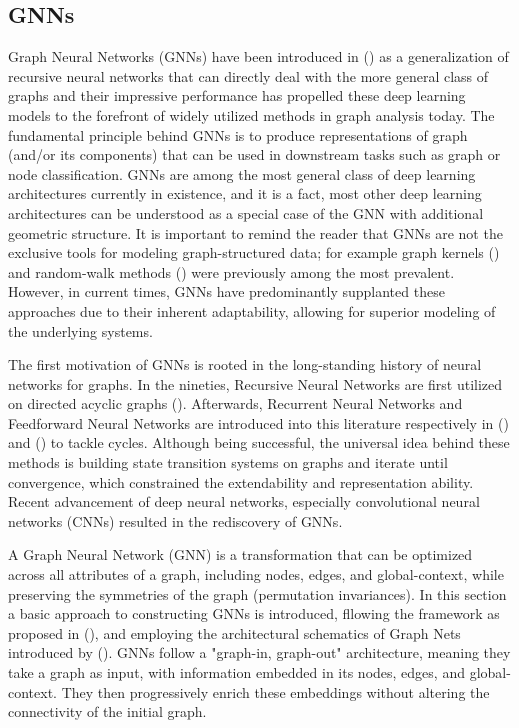 \documentclass[binding=0.6cm]{sapthesis}
\newcommand{\mycite}[1]{(\cite{#1})}
\begin{document}
\subsection{GNNs}
\label{sec:bg.gnn.gnns}
Graph Neural Networks (GNNs) have been introduced in \mycite{Gori2005graphDomain,gnnModel2009} as a generalization of recursive neural networks that can directly deal with the more general class of graphs and their impressive performance has propelled these deep learning models to the forefront of widely utilized methods in graph analysis today. The fundamental principle behind GNNs is to produce representations of graph (and/or its components) that can be used in downstream tasks such as graph or node classification. GNNs are among the most general class of deep learning architectures currently in existence, and it is a fact, most other deep learning architectures can be understood as a special case of the GNN with additional geometric structure. It is important to remind the reader that GNNs are not the exclusive tools for modeling graph-structured data; for example graph kernels \mycite{vishwanathan2010-graph-kernels} and random-walk methods \mycite{grover2016-node2vec,perozzi2014-deepwalk} were previously among the most prevalent. However, in current times, GNNs have predominantly supplanted these approaches due to their inherent adaptability, allowing for superior modeling of the underlying systems.

The first motivation of GNNs is rooted in the long-standing history of neural networks for graphs. In the nineties, Recursive Neural Networks are first utilized on directed acyclic graphs (\cite{Sperduti1997,Frasconi1998}). Afterwards, Recurrent Neural Networks and Feedforward Neural Networks are introduced into this literature respectively in (\cite{gnnModel2009}) and (\cite{Micheli2009}) to tackle cycles. Although being successful, the universal idea behind these methods is building state transition systems on graphs and iterate until convergence, which constrained the extendability and representation ability. Recent advancement of deep neural networks, especially convolutional neural networks (CNNs) resulted in the rediscovery of GNNs. 

A Graph Neural Network (GNN) is a transformation that can be optimized across all attributes of a graph, including nodes, edges, and global-context, while preserving the symmetries of the graph (permutation invariances). In this section a basic approach to constructing GNNs is introduced, fllowing the  framework as proposed in (\cite{gilmer2017-message-passing}), and employing the architectural schematics of Graph Nets introduced by (\cite{battaglia2018-relational}). GNNs follow a "graph-in, graph-out" architecture, meaning they take a graph as input, with information embedded in its nodes, edges, and global-context. They then progressively enrich these embeddings without altering the connectivity of the initial graph.
\end{document}
